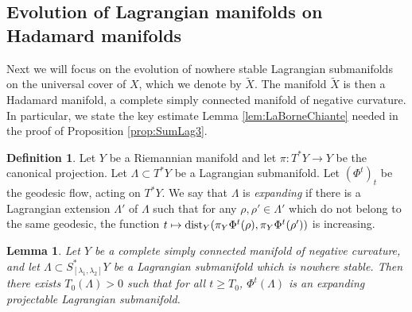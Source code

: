 \documentclass[10pt]{amsart}
\newcommand\mto{\mathchoice{\longmapsto}{\mapsto}{\mapsto}{\mapsto}}
\DeclareMathOperator{\dist}{dist}
\theoremstyle{plain}
\newtheorem{lemma}[theorem]{Lemma}
\theoremstyle{definition}
\newtheorem{definition}[theorem]{Definition}
\begin{document}
\subsection{Evolution of Lagrangian manifolds on Hadamard manifolds}\label{ss:ClassicHadamard}

Next we will focus on the evolution of nowhere stable Lagrangian submanifolds on the universal cover of $X$, which we denote by $\tilde{X}$. The manifold $\tilde{X}$ is then a Hadamard manifold, \ie a complete simply connected manifold of negative curvature. In particular, we state the key estimate Lemma \ref{lem:LaBorneChiante} needed in the proof of Proposition \ref{prop:SumLag3}.

\begin{definition}
Let $Y$ be a Riemannian manifold and let $\pi:T^*Y\to Y$ be the canonical projection. Let $\Lambda\subset T^*Y$ be a Lagrangian submanifold. Let $(\Phi^t)_t$ be the geodesic flow, acting on $T^*Y$. We say that $\Lambda$ is \emph{expanding} if there is a Lagrangian extension $\Lambda'$ of $\Lambda$ such that for any $\rho,\rho'\in\Lambda'$ which do not belong to the same geodesic, the function $t\mto\dist_Y(\pi_Y\Phi^t(\rho),\pi_Y \Phi^t(\rho'))$ is increasing.
\end{definition}

\begin{lemma}\label{lem:LongTimeProj}
Let $Y$ be a complete simply connected manifold of negative curvature, and let $\Lambda\subset S^*_{[\lambda_1,\lambda_2]}Y$ be a Lagrangian submanifold which is nowhere stable. Then there exists $T_0(\Lambda)>0$ such that for all $t\geq T_0$, $\Phi^{t} (\Lambda)$ is an expanding projectable Lagrangian submanifold.
\end{lemma}
\end{document}
